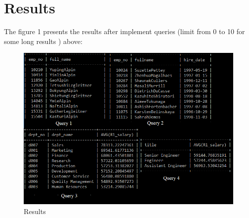 \documentclass{article}
\begin{document}
\section*{Results}

The figure 1 presents the results after implement queries (limit from 0 to 10 for some long results
) above:\\
\begin{figure}
\includegraphics[scale = 0.8]{result.PNG}
\caption{Results}
\end{figure}
\end{document}
